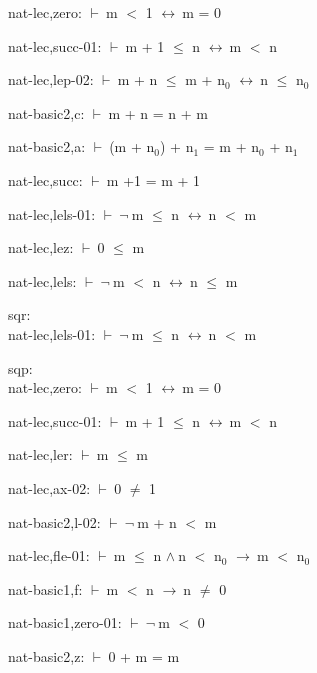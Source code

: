 \documentclass[a4paper]{article}
\newcommand{\Fol}{\mbox{$\vdash\ $}}
\newcommand{\Not}{\mbox{$\neg\ $}}
\newcommand{\And}{\mbox{$\wedge\ $}}
\newcommand{\Imp}{\mbox{$\rightarrow\ $}}
\newcommand{\Equiv}{\mbox{$\leftrightarrow\ $}}
\begin{document}
nat-lec,zero: 
 \Fol m $<$ 1 \Equiv m = 0



nat-lec,succ-01: 
 \Fol m + 1 $\le$ n \Equiv m $<$ n



nat-lec,lep-02: 
 \Fol m + n $\le$ m + $\mbox{n}_{0}$ \Equiv n $\le$ $\mbox{n}_{0}$



nat-basic2,c: 
 \Fol m + n = n + m



nat-basic2,a: 
 \Fol (m + $\mbox{n}_{0}$) + $\mbox{n}_{1}$ = m + $\mbox{n}_{0}$ + $\mbox{n}_{1}$



nat-lec,succ: 
 \Fol m +1 = m + 1



nat-lec,lels-01: 
 \Fol \Not m $\le$ n \Equiv n $<$ m



nat-lec,lez: 
 \Fol 0 $\le$ m



nat-lec,lels: 
 \Fol \Not m $<$ n \Equiv n $\le$ m



\bigskip

sqr:\\ nat-lec,lels-01: 
 \Fol \Not m $\le$ n \Equiv n $<$ m



\bigskip

sqp:\\ nat-lec,zero: 
 \Fol m $<$ 1 \Equiv m = 0



nat-lec,succ-01: 
 \Fol m + 1 $\le$ n \Equiv m $<$ n



nat-lec,ler: 
 \Fol m $\le$ m



nat-lec,ax-02: 
 \Fol 0 $\neq$ 1



nat-basic2,l-02: 
 \Fol \Not m + n $<$ m



nat-lec,fle-01: 
 \Fol m $\le$ n \And n $<$ $\mbox{n}_{0}$ \Imp m $<$ $\mbox{n}_{0}$



nat-basic1,f: 
 \Fol m $<$ n \Imp n $\neq$ 0



nat-basic1,zero-01: 
 \Fol \Not m $<$ 0



nat-basic2,z: 
 \Fol 0 + m = m
\end{document}
